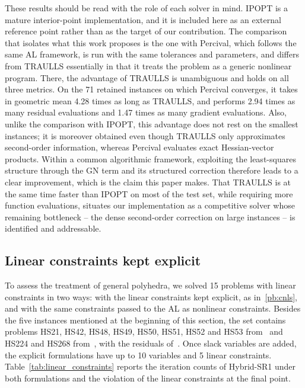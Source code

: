\documentclass{article}
\numberwithin{equation}{section}
\theoremstyle{plain}
\begin{document}
These results should be read with the role of each solver in mind. IPOPT is a mature interior-point implementation, and it is included here as an external reference point rather than as the target of our contribution. The comparison that isolates what this work proposes is the one with Percival, which follows the same AL framework, is run with the same tolerances and parameters, and differs from TRAULLS essentially in that it treats the problem as a generic nonlinear program. There, the advantage of TRAULLS is unambiguous and holds on all three metrics. On the 71 retained instances on which Percival converges, it takes in geometric mean 4.28 times as long as TRAULLS, and performs 2.94 times as many residual evaluations and 1.47 times as many gradient evaluations. Also, unlike the comparison with IPOPT, this advantage does not rest on the smallest instances; it is moreover obtained even though TRAULLS only approximates second-order information, whereas Percival evaluates exact Hessian-vector products. Within a common algorithmic framework, exploiting the least-squares structure through the GN term and its structured correction therefore leads to a clear improvement, which is the claim this paper makes. That TRAULLS is at the same time faster than IPOPT on most of the test set, while requiring more function evaluations, situates our implementation as a competitive solver whose remaining bottleneck -- the dense second-order correction on large instances -- is identified and addressable.

\subsection{Linear constraints kept explicit}\label{subsec:linear_constraints}

To assess the treatment of general polyhedra, we solved 15 problems with linear constraints in two ways: with the linear constraints kept explicit, as in~\eqref{pb:cnls}, and with the same constraints passed to the AL as nonlinear constraints. Besides the five instances mentioned at the beginning of this section, the set contains problems HS21, HS42, HS48, HS49, HS50, HS51, HS52 and HS53 from~\cite{hockschittkowski:1980} and HS224 and HS268 from~\cite{schittkowski:1987}, with the residuals of~\cite{nls-problems-julia}. Once slack variables are added, the explicit formulations have up to 10 variables and 5 linear constraints. Table~\ref{tab:linear_constraints} reports the iteration counts of Hybrid-SR1 under both formulations and the violation of the linear constraints at the final point.
\end{document}
